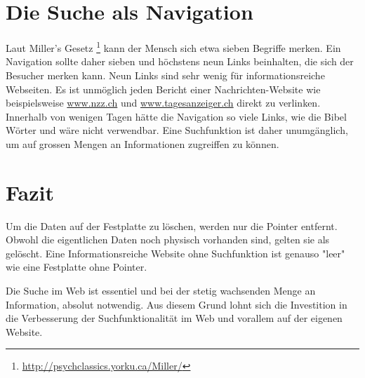 \section{Die Suche als Navigation}
Laut Miller's Gesetz \footnote{\url{http://psychclassics.yorku.ca/Miller/}} kann der Mensch sich etwa sieben Begriffe merken. Ein Navigation sollte daher sieben und höchstens neun Links beinhalten, die sich der Besucher merken kann. Neun Links sind sehr wenig für informationsreiche Webseiten. Es ist unmöglich jeden Bericht einer Nachrichten-Website wie beispielsweise \url{www.nzz.ch} und \url{www.tagesanzeiger.ch} direkt zu verlinken. Innerhalb von wenigen Tagen hätte die Navigation so viele Links, wie die Bibel Wörter und wäre nicht verwendbar. Eine Suchfunktion ist daher unumgänglich, um auf grossen Mengen an Informationen zugreiffen zu können.

\section{Fazit}
Um die Daten auf der Festplatte zu löschen, werden nur die Pointer entfernt. Obwohl die eigentlichen Daten noch physisch vorhanden sind, gelten sie als gelöscht. Eine Informationsreiche Website ohne Suchfunktion ist genauso "leer" wie eine Festplatte ohne Pointer.

Die Suche im Web ist essentiel und bei der stetig wachsenden Menge an Information, absolut notwendig. Aus diesem Grund lohnt sich die Investition in die Verbesserung der Suchfunktionalität im Web und vorallem auf der eigenen Website.

